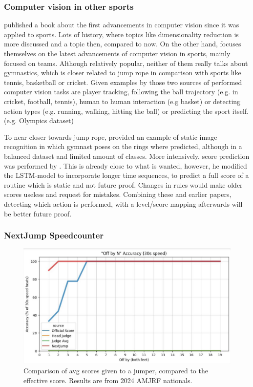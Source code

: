 \subsubsection{Computer vision in other sports}
\label{subsubsec:literature-computer-vision-sports}

\textcite{Soomro_2014} published a book about the first advancements in computer vision since it was applied to sports. Lots of history, where topics like dimensionality reduction is more discussed and a topic then, compared to now. On the other hand, \textcite{Yin_2024} focuses themselves on the latest advancements of computer vision in sports, mainly focused on teams. Although relatively popular, neither of them really talks about gymnastics, which is closer related to jump rope in comparison with sports like tennis, basketball or cricket.
Given examples by those two sources of performed computer vision tasks are player tracking, following the ball trajectory (e.g. in cricket, football, tennis), human to human interaction (e.g basket) or detecting action types (e.g. running, walking, hitting the ball) or predicting the sport itself. (e.g. Olympics dataset)

To near closer towards jump rope, \textcite{Abdullah_2023} provided an example of static image recognition in which gymnast poses on the rings where predicted, although in a balanced dataset and limited amount of classes. More intensively, score prediction was performed by \textcite{Zahan_2023}. This is already close to what is wanted, however, he modified the LSTM-model to incorporate longer time sequences, to predict a full score of a routine which is static and not future proof. Changes in rules would make older scores useless and request for mistakes.
Combining these and earlier papers, detecting which action is performed, with a level/score mapping afterwards will be better future proof.

\subsubsection{NextJump Speedcounter}
\label{subsubsec:literature-nextjump-speedcounter}

\begin{figure}
    \centering
    \includegraphics[width=0.95\linewidth]{img/nextjump-off-by-feet}
    \caption[nextjump-results]{Comparison of avg scores given to a jumper, compared to the effective score. Results are from 2024 AMJRF nationals.}
    \label{fig:nextjump-off-by-feet}
\end{figure}

